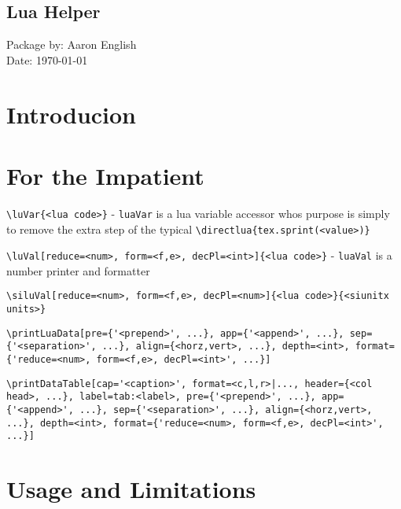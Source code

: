 \documentclass[hidelinks, 12pt]{article}%
\begin{document}
    \frontmatter
        \begin{center}
            \vspace*{1cm}
            \section*{\Huge Lua Helper}%
            \vspace{6cm}
            \begin{centering}
                \Large{Package by: Aaron English\\
                Date: \today}
            \end{centering}
        \end{center}
        \thispagestyle{empty}

    \clearpage
    \mainmatter
        \section{Introducion}
        \section{For the Impatient}
        \lstinline[language={[LaTeX]TeX}]!\luVar{<lua code>}! - \verb|luaVar| is a lua variable accessor whos purpose is
            simply to remove the extra step of the typical \verb|\directlua{tex.sprint(<value>)}|
            
            \lstinline[language={[LaTeX]TeX}]!\luVal[reduce=<num>, form=<f,e>, decPl=<int>]{<lua code>}! - \verb|luaVal| is a
            number printer and formatter

            \lstinline[language={[LaTeX]TeX}]!\siluVal[reduce=<num>, form=<f,e>, decPl=<num>]{<lua code>}{<siunitx units>}!

            \lstinline[language={[LaTeX]TeX}]!\printLuaData[pre={'<prepend>', ...}, app={'<append>', ...}, sep={'<separation>', ...}, align={<horz,vert>, ...}, depth=<int>, format={'reduce=<num>, form=<f,e>, decPl=<int>', ...}]!

            \lstinline[language={[LaTeX]TeX}]!\printDataTable[cap='<caption>', format=<c,l,r>|..., header={<col head>, ...}, label=tab:<label>, pre={'<prepend>', ...}, app={'<append>', ...}, sep={'<separation>', ...}, align={<horz,vert>, ...}, depth=<int>, format={'reduce=<num>, form=<f,e>, decPl=<int>', ...}]!

        \section{Usage and Limitations}
\end{document}
